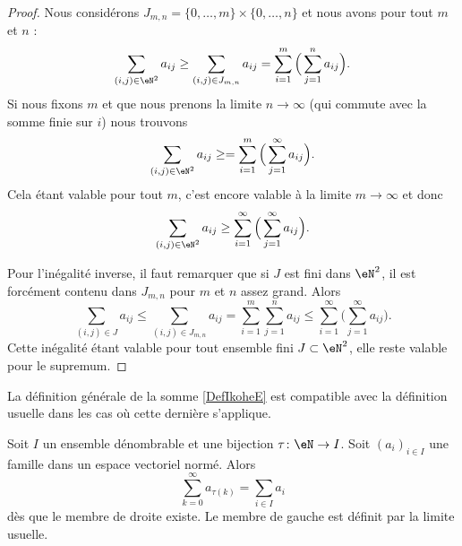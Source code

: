 \begin{proof}
    Nous considérons \( J_{m,n}=\{ 0,\ldots, m \}\times \{ 0,\ldots, n \}\) et nous avons pour tout \( m\) et \( n\) :
    \begin{equation}
        \sum_{(i,j)\in \eN^2}a_{ij}\geq \sum_{(i,j)\in J_{m,n}}a_{ij}=\sum_{i=1}^m\Big( \sum_{j=1}^na_{ij} \Big).
    \end{equation}
    Si nous fixons \( m\) et que nous prenons la limite \( n\to \infty\) (qui commute avec la somme finie sur \( i\)) nous trouvons
    \begin{equation}
        \sum_{(i,j)\in \eN^2}a_{ij}\geq =\sum_{i=1}^m\Big( \sum_{j=1}^{\infty}a_{ij} \Big).
    \end{equation}
    Cela étant valable pour tout \( m\), c'est encore valable à la limite \( m\to \infty\) et donc
    \begin{equation}
        \sum_{(i,j)\in \eN^2}a_{ij}\geq \sum_{i=1}^{\infty}\Big( \sum_{j=1}^{\infty}a_{ij} \Big).
    \end{equation}
    
    Pour l'inégalité inverse, il faut remarquer que si \( J\) est fini dans \( \eN^2\), il est forcément contenu dans \( J_{m,n}\) pour \( m\) et \( n\) assez grand. Alors
    \begin{equation}
        \sum_{(i,j)\in J}a_{ij}\leq \sum_{(i,j)\in J_{m,n}}a_{ij}=\sum_{i=1}^m\sum_{j=1}^na_{ij}\leq \sum_{i=1}^{\infty}\Big( \sum_{j=1}^{\infty}a_{ij} \Big).
    \end{equation}
    Cette inégalité étant valable pour tout ensemble fini \( J\subset \eN^2\), elle reste valable pour le supremum.    
\end{proof}

La définition générale de la somme \ref{DefIkoheE} est compatible avec la définition usuelle dans les cas où cette dernière s'applique.
\begin{proposition}\label{PropoWHdjw}
    Soit \( I\) un ensemble dénombrable et une bijection \( \tau\colon \eN\to I\). Soit \( (a_i)_{i\in I}\) une famille dans un espace vectoriel normé. Alors
    \begin{equation}
        \sum_{k=0}^{\infty}a_{\tau(k)}=\sum_{i\in I}a_i
    \end{equation}
    dès que le membre de droite existe. Le membre de gauche est définit par la limite usuelle.
\end{proposition}

